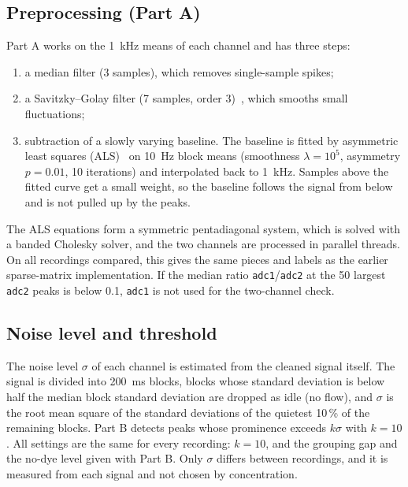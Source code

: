 \subsection{Preprocessing (Part A)}
Part A works on the \SI{1}{\kilo\hertz} means of each channel and has three steps:
\begin{enumerate}
  \item a median filter (3 samples), which removes single-sample spikes;
  \item a Savitzky--Golay filter (7 samples, order 3)~\cite{savitzky1964}, which smooths small
        fluctuations;
  \item subtraction of a slowly varying baseline. The baseline is fitted by asymmetric least
        squares (ALS)~\cite{eilers2005} on \SI{10}{\hertz} block means (smoothness
        $\lambda = 10^{5}$, asymmetry $p = 0.01$, 10 iterations) and interpolated back to
        \SI{1}{\kilo\hertz}. Samples above the fitted curve get a small weight, so the baseline
        follows the signal from below and is not pulled up by the peaks.
\end{enumerate}
The ALS equations form a symmetric pentadiagonal system, which is solved with a banded
Cholesky solver, and the two channels are processed in parallel threads. On all recordings
compared, this gives the same pieces and labels as the earlier sparse-matrix implementation.
If the median ratio \texttt{adc1}/\texttt{adc2} at the 50 largest \texttt{adc2} peaks is below
0.1, \texttt{adc1} is not used for the two-channel check.

\subsection{Noise level and threshold}
\label{sec:threshold}
The noise level $\sigma$ of each channel is estimated from the cleaned signal itself. The signal
is divided into \SI{200}{\milli\second} blocks, blocks whose standard deviation is below half the
median block standard deviation are dropped as idle (no flow), and $\sigma$ is the root mean
square of the standard deviations of the quietest 10\,\% of the remaining blocks.
Part B detects peaks whose prominence exceeds $k\sigma$ with $k = 10$.
All settings are the same for every recording: $k = 10$, and the grouping gap and the no-dye
level given with Part B. Only $\sigma$ differs between recordings, and it is measured from each
signal and not chosen by concentration.
